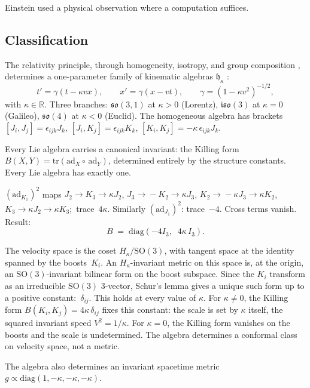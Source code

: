 \documentclass[11pt]{article}
\begin{document}
Einstein used a physical observation where a computation suffices.


\subsection*{Classification}

The relativity principle, through homogeneity, isotropy, and group composition \cite{LevyLeblond1976}, determines a one-parameter family of kinematic algebras $\mathfrak{h}_\kappa$ \cite{Ignatowski1910,BerziGorini1969,BacryLL1968}:
\[
t' = \gamma(t-\kappa vx),\qquad x' = \gamma(x-vt),\qquad \gamma = (1-\kappa v^2)^{-1/2},
\]
with $\kappa \in \mathbb{R}$. Three branches: $\mathfrak{so}(3,1)$ at $\kappa > 0$ (Lorentz), $\mathfrak{iso}(3)$ at $\kappa = 0$ (Galileo), $\mathfrak{so}(4)$ at $\kappa < 0$ (Euclid). The homogeneous algebra has brackets $[J_i,J_j] = \epsilon_{ijk}J_k$,\; $[J_i,K_j] = \epsilon_{ijk}K_k$,\; $[K_i,K_j] = -\kappa\,\epsilon_{ijk}J_k$.

Every Lie algebra carries a canonical invariant: the Killing form $B(X,Y) = \mathrm{tr}(\mathrm{ad}_X\!\circ\,\mathrm{ad}_Y)$, determined entirely by the structure constants. Every Lie algebra has exactly one.

$(\mathrm{ad}_{K_1})^2$ maps $J_2 \!\to\! K_3 \!\to\! \kappa J_2$,\; $J_3 \!\to\! {-}K_2 \!\to\! \kappa J_3$,\; $K_2 \!\to\! {-}\kappa J_3 \!\to\! \kappa K_2$,\; $K_3 \!\to\! \kappa J_2 \!\to\! \kappa K_3$;\, trace~$4\kappa$. Similarly $(\mathrm{ad}_{J_1})^2$: trace~$-4$. Cross terms vanish. Result:
\[
B \;=\; \mathrm{diag}(-4I_3,\;\;4\kappa\, I_3).
\]

The velocity space is the coset $H_\kappa/\mathrm{SO}(3)$, with tangent space at the identity spanned by the boosts~$K_i$. An $H_\kappa$-invariant metric on this space is, at the origin, an $\mathrm{SO}(3)$-invariant bilinear form on the boost subspace. Since the $K_i$ transform as an irreducible $\mathrm{SO}(3)$ 3-vector, Schur's lemma gives a unique such form up to a positive constant:~$\delta_{ij}$. This holds at every value of $\kappa$. For $\kappa \neq 0$, the Killing form $B(K_i, K_j) = 4\kappa\,\delta_{ij}$ fixes this constant: the scale is set by $\kappa$ itself, the squared invariant speed $V^2 = 1/\kappa$. For $\kappa = 0$, the Killing form vanishes on the boosts and the scale is undetermined. The algebra determines a conformal class on velocity space, not a metric.

The algebra also determines an invariant spacetime metric $g \propto \mathrm{diag}(1,-\kappa,-\kappa,-\kappa)$.
\end{document}

